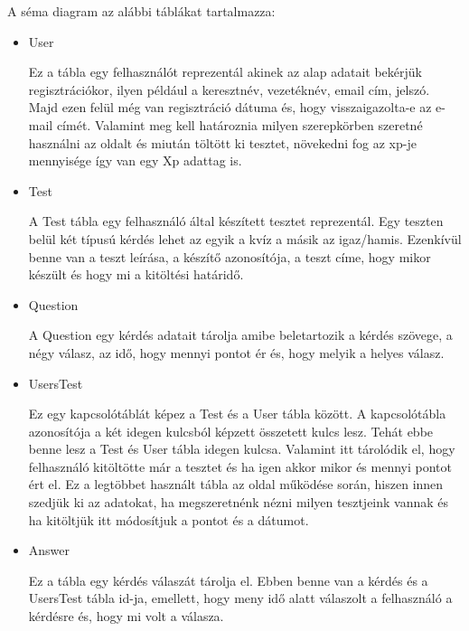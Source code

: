 A séma diagram  az alábbi táblákat tartalmazza:
\begin{itemize}
    \item {User}
          \begin{addmargin}[\parindent]{0pt}
              Ez a tábla egy felhasználót reprezentál akinek az alap adatait bekérjük regisztrációkor, ilyen például a keresztnév, vezetéknév, email cím, jelszó. Majd ezen felül még van regisztráció dátuma és, hogy visszaigazolta-e az e-mail címét. Valamint meg kell határoznia milyen szerepkörben szeretné használni az oldalt és miután töltött ki tesztet, növekedni fog az xp-je mennyisége így van egy Xp adattag is.
          \end{addmargin}

    \item {Test}
          \begin{addmargin}[\parindent]{0pt}
              A Test tábla egy felhasználó által készített tesztet reprezentál. Egy teszten belül két típusú kérdés lehet az egyik a kvíz a másik az igaz/hamis. Ezenkívül benne van a teszt leírása, a készítő azonosítója, a teszt címe, hogy mikor készült és hogy mi a kitöltési határidő.
          \end{addmargin}

    \item {Question}
          \begin{addmargin}[\parindent]{0pt}
              A Question egy kérdés adatait tárolja amibe beletartozik a kérdés szövege, a négy válasz, az idő, hogy mennyi pontot ér és, hogy melyik a helyes válasz.
          \end{addmargin}

    \item {UsersTest}
          \begin{addmargin}[\parindent]{0pt}
              Ez egy kapcsolótáblát képez a Test és a User tábla között. A kapcsolótábla azonosítója a két idegen kulcsból képzett összetett kulcs lesz. Tehát ebbe benne lesz a Test és User tábla idegen kulcsa. Valamint itt tárolódik el, hogy felhasználó kitöltötte már a tesztet és ha igen akkor mikor és mennyi pontot ért el. Ez a legtöbbet használt tábla az oldal működése során, hiszen innen szedjük ki az adatokat, ha megszeretnénk nézni milyen tesztjeink vannak és ha kitöltjük itt módosítjuk a pontot és a dátumot.
          \end{addmargin}

    \item {Answer}
          \begin{addmargin}[\parindent]{0pt}
              Ez a tábla egy kérdés válaszát tárolja el. Ebben benne van a kérdés és a UsersTest tábla id-ja, emellett, hogy meny idő alatt válaszolt a felhasználó a kérdésre és, hogy mi volt a válasza.
          \end{addmargin}
\end{itemize}

